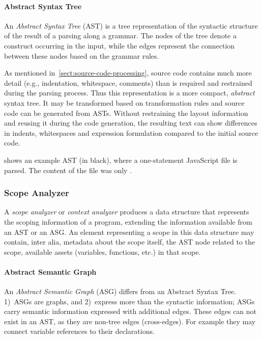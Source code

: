\paragraph{Abstract Syntax Tree}
An \emph{Abstract Syntax Tree} (AST) is a tree representation of the syntactic structure of the result of a parsing along a grammar. The nodes of the tree denote a construct occurring in the input, while the edges represent the connection between these nodes based on the grammar rules.

As mentioned in~\cref{sect:source-code-processing}, source code contains much more detail (e.g., indentation, whitespace, comments) than is required and restrained during the parsing process. Thus this representation is a more compact, \emph{abstract} syntax tree. It may be transformed based on transformation rules and source code can be generated from ASTs. Without restraining the layout information and reusing it during the code generation, the resulting text can show differences in indents, whitespaces and expression formulation compared to the initial source code.

 shows an example AST (in black), where a one-statement JavaScript file is parsed. The content of the file was only .

\subsubsection{Scope Analyzer}
A \emph{scope analyzer} or \emph{context analyzer} produces a data structure that represents the scoping information of a program, extending the information available from an AST or an ASG. An element representing a scope in this data structure may contain, inter alia, metadata about the scope itself, the AST node related to the scope, available assets (variables, functions, etc.) in that scope.~\cite{shift-scope}

\paragraph{Abstract Semantic Graph}
An \emph{Abstract Semantic Graph} (ASG) differs from an Abstract Syntax Tree. 1)~ASGs are graphs, and 2)~express more than the syntactic information; ASGs carry semantic information expressed with additional edges. These edges can not exist in an AST, as they are non-tree edges (cross-edges). For example they may connect variable references to their declarations.~\cite{raghavan_dex:_2004}

